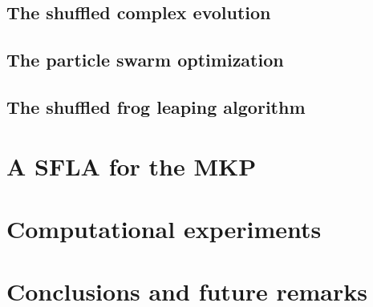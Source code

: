 \documentclass[10pt, conference, compsocconf]{IEEEtran}
\begin{document}
\subsection{The shuffled complex evolution}


\subsection{The particle swarm optimization}
\subsection{The shuffled frog leaping algorithm}

\section{A SFLA for the MKP}
\label{sec:sfla-mkp}

\section{Computational experiments}
\label{sec:exp}

\section{Conclusions and future remarks}
\label{sec:conc}

%



\end{document}
